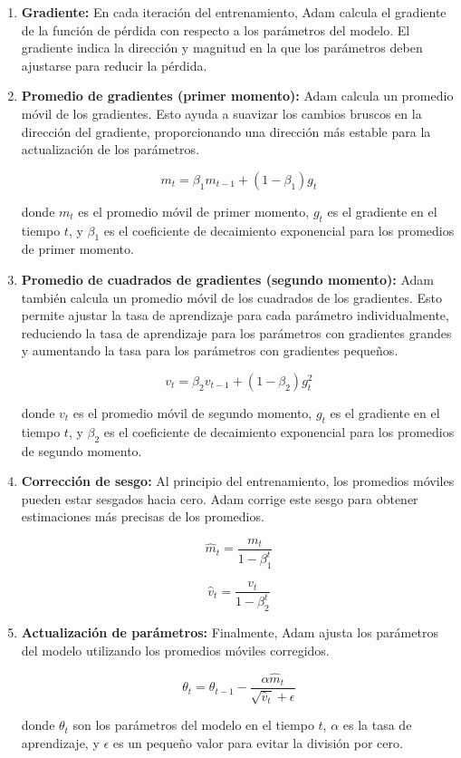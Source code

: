 \begin{enumerate}
	\item \textbf{Gradiente:} En cada iteración del entrenamiento, Adam calcula el gradiente de la función de pérdida con respecto a los parámetros del modelo. El gradiente indica la dirección y magnitud en la que los parámetros deben ajustarse para reducir la pérdida.
	
	\item \textbf{Promedio de gradientes (primer momento):} Adam calcula un promedio móvil de los gradientes. Esto ayuda a suavizar los cambios bruscos en la dirección del gradiente, proporcionando una dirección más estable para la actualización de los parámetros.

	$$ m_t = \beta_1 m_{t-1} + (1 - \beta_1) g_t $$

	donde $m_t$ es el promedio móvil de primer momento, $g_t$ es el gradiente en el tiempo $t$, y $\beta_1$ es el coeficiente de decaimiento exponencial para los promedios de primer momento.
	
	\item \textbf{Promedio de cuadrados de gradientes (segundo momento):} Adam también calcula un promedio móvil de los cuadrados de los gradientes. Esto permite ajustar la tasa de aprendizaje para cada parámetro individualmente, reduciendo la tasa de aprendizaje para los parámetros con gradientes grandes y aumentando la tasa para los parámetros con gradientes pequeños.

	$$ v_t = \beta_2 v_{t-1} + (1 - \beta_2) g_t^2 $$

	donde $v_t$ es el promedio móvil de segundo momento, $g_t$ es el gradiente en el tiempo $t$, y $\beta_2$ es el coeficiente de decaimiento exponencial para los promedios de segundo momento.
	
	\item \textbf{Corrección de sesgo:} Al principio del entrenamiento, los promedios móviles pueden estar sesgados hacia cero. Adam corrige este sesgo para obtener estimaciones más precisas de los promedios.

	$$ \hat{m}_t = \frac{m_t}{1 - \beta_1^t} $$

	$$ \hat{v}_t = \frac{v_t}{1 - \beta_2^t} $$

	
	\item \textbf{Actualización de parámetros:} Finalmente, Adam ajusta los parámetros del modelo utilizando los promedios móviles corregidos.

	$$ \theta_t = \theta_{t-1} - \frac{\alpha \hat{m}_t}{\sqrt{\hat{v}_t} + \epsilon} $$

	donde $\theta_t$ son los parámetros del modelo en el tiempo $t$, $\alpha$ es la tasa de aprendizaje, y $\epsilon$ es un pequeño valor para evitar la división por cero.
\end{enumerate}

